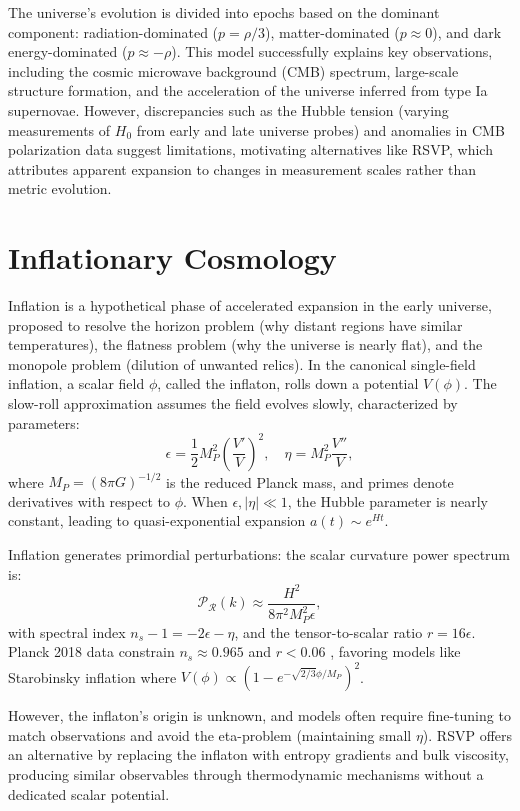 \documentclass[12pt, a4paper, openany]{book}
\theoremstyle{definition}
\begin{document}
The universe's evolution is divided into epochs based on the dominant component: radiation-dominated ($p = \rho/3$), matter-dominated ($p \approx 0$), and dark energy-dominated ($p \approx -\rho$). This model successfully explains key observations, including the cosmic microwave background (CMB) spectrum, large-scale structure formation, and the acceleration of the universe inferred from type Ia supernovae. However, discrepancies such as the Hubble tension (varying measurements of $H_0$ from early and late universe probes) and anomalies in CMB polarization data suggest limitations, motivating alternatives like RSVP, which attributes apparent expansion to changes in measurement scales rather than metric evolution.

\section{Inflationary Cosmology}
Inflation is a hypothetical phase of accelerated expansion in the early universe, proposed to resolve the horizon problem (why distant regions have similar temperatures), the flatness problem (why the universe is nearly flat), and the monopole problem (dilution of unwanted relics). In the canonical single-field inflation, a scalar field $\phi$, called the inflaton, rolls down a potential $V(\phi)$. The slow-roll approximation assumes the field evolves slowly, characterized by parameters:
\begin{equation}
\epsilon = \frac{1}{2} M_P^2 \left( \frac{V'}{V} \right)^2, \quad \eta = M_P^2 \frac{V''}{V},
\end{equation}
where $M_P = (8\pi G)^{-1/2}$ is the reduced Planck mass, and primes denote derivatives with respect to $\phi$. When $\epsilon, |\eta| \ll 1$, the Hubble parameter is nearly constant, leading to quasi-exponential expansion $a(t) \sim e^{Ht}$.

Inflation generates primordial perturbations: the scalar curvature power spectrum is:
\begin{equation}
\mathcal{P}_\mathcal{R}(k) \approx \frac{H^2}{8\pi^2 M_P^2 \epsilon},
\end{equation}
with spectral index $n_s - 1 = -2\epsilon - \eta$, and the tensor-to-scalar ratio $r = 16\epsilon$. Planck 2018 data constrain $n_s \approx 0.965$ and $r < 0.06$ \citep{Planck:2020}, favoring models like Starobinsky inflation where $V(\phi) \propto (1 - e^{-\sqrt{2/3} \phi / M_P})^2$.

However, the inflaton's origin is unknown, and models often require fine-tuning to match observations and avoid the eta-problem (maintaining small $\eta$). RSVP offers an alternative by replacing the inflaton with entropy gradients and bulk viscosity, producing similar observables through thermodynamic mechanisms without a dedicated scalar potential.
\end{document}
